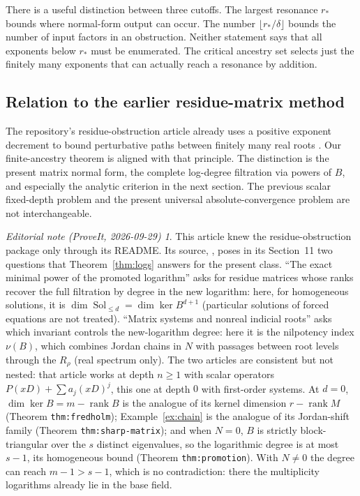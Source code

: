 \documentclass[11pt,a4paper]{article}
\numberwithin{equation}{section}
\theoremstyle{definition}
\theoremstyle{remark}
\newtheorem*{ednote}{Editorial note (ProveIt, 2026-09-29)}
\newcommand{\rank}{\operatorname{rank}}
\DeclareMathOperator{\Sol}{Sol}
\begin{document}
There is a useful distinction between three cutoffs. The largest resonance
$r_*$ bounds where normal-form output can occur. The number
$\lfloor r_*/\delta\rfloor$ bounds the number of input factors in an
obstruction. Neither statement says that all exponents below $r_*$ must be
enumerated. The critical ancestry set selects just the finitely many
exponents that can actually reach a resonance by addition.

\subsection{Relation to the earlier residue-matrix method}
The repository's residue-obstruction article already uses a positive
exponent decrement to bound perturbative paths between finitely many real
roots \cite{repo-residue}. Our finite-ancestry theorem is aligned with that
principle. The distinction is the present matrix normal form, the complete
log-degree filtration via powers of $B$, and especially the analytic
criterion in the next section. The previous scalar fixed-depth problem and
the present universal absolute-convergence problem are not interchangeable.

\begin{ednote}\label{ed:residue-questions}
This article knew the residue-obstruction package only through its README.
Its source,
,
poses in its Section~11 two questions that Theorem~\ref{thm:logs} answers
for the present class. ``The exact minimal power of the promoted
logarithm'' asks for residue matrices whose ranks recover the full
filtration by degree in the new logarithm: here, for homogeneous
solutions, it is $\dim\Sol_{\le d}=\dim\ker B^{d+1}$ (particular solutions
of forced equations are not treated). ``Matrix systems and nonreal
indicial roots'' asks which invariant controls the new-logarithm degree:
here it is the nilpotency index $\nu(B)$, which combines Jordan chains in
$N$ with passages between root levels through the $R_\rho$ (real spectrum
only). The two articles are consistent but not nested: that article works
at depth $n\ge1$ with scalar operators $P(xD)+\sum a_j(xD)^j$, this one at
depth $0$ with first-order systems. At $d=0$, $\dim\ker B=m-\rank B$ is the
analogue of its kernel dimension $r-\rank M$ (Theorem \texttt{thm:fredholm});
Example~\ref{ex:chain} is the analogue of its Jordan-shift family (Theorem
\texttt{thm:sharp-matrix}); and when $N=0$, $B$ is strictly block-triangular
over the $s$ distinct eigenvalues, so the logarithmic degree is at most
$s-1$, its homogeneous bound (Theorem \texttt{thm:promotion}). With
$N\ne0$ the degree can reach $m-1>s-1$, which is no contradiction: there
the multiplicity logarithms already lie in the base field.
\end{ednote}
\end{document}

